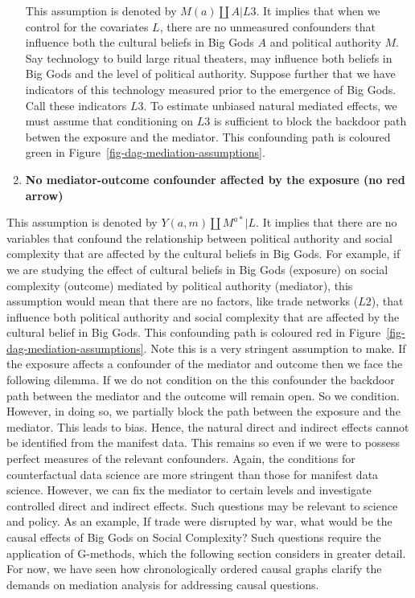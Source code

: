 \documentclass[
  singlecolumn]{report}
\begin{document}
\begin{enumerate}
  This assumption is denoted by \(M(a) \coprod A | L3\). It implies that
  when we control for the covariates \(L\), there are no unmeasured
  confounders that influence both the cultural beliefs in Big Gods \(A\)
  and political authority \(M\). Say technology to build large ritual
  theaters, may influence both beliefs in Big Gods and the level of
  political authority. Suppose further that we have indicators of this
  technology measured prior to the emergence of Big Gods. Call these
  indicators \(L3\). To estimate unbiased natural mediated effects, we
  must assume that conditioning on \(L3\) is sufficient to block the
  backdoor path betwen the exposure and the mediator. This confounding
  path is coloured green in Figure~\ref{fig-dag-mediation-assumptions}.
\item
  \textbf{No mediator-outcome confounder affected by the exposure (no
  red arrow)}
\end{enumerate}

This assumption is denoted by \(Y(a,m) \coprod M^{a*} | L\). It implies
that there are no variables that confound the relationship between
political authority and social complexity that are affected by the
cultural beliefs in Big Gods. For example, if we are studying the effect
of cultural beliefs in Big Gods (exposure) on social complexity
(outcome) mediated by political authority (mediator), this assumption
would mean that there are no factors, like trade networks (\(L2\)), that
influence both political authority and social complexity that are
affected by the cultural belief in Big Gods. This confounding path is
coloured red in Figure~\ref{fig-dag-mediation-assumptions}. Note this is
a very stringent assumption to make. If the exposure affects a
confounder of the mediator and outcome then we face the following
dilemma. If we do not condition on the this confounder the backdoor path
between the mediator and the outcome will remain open. So we condition.
However, in doing so, we partially block the path between the exposure
and the mediator. This leads to bias. Hence, the natural direct and
indirect effects cannot be identified from the manifest data. This
remains so even if we were to possess perfect measures of the relevant
confounders. Again, the conditions for counterfactual data science are
more stringent than those for manifest data science. However, we can fix
the mediator to certain levels and investigate controlled direct and
indirect effects. Such questions may be relevant to science and policy.
As an example, If trade were disrupted by war, what would be the causal
effects of Big Gods on Social Complexity? Such questions require the
application of G-methods, which the following section considers in
greater detail. For now, we have seen how chronologically ordered causal
graphs clarify the demands on mediation analysis for addressing causal
questions.
\end{document}
